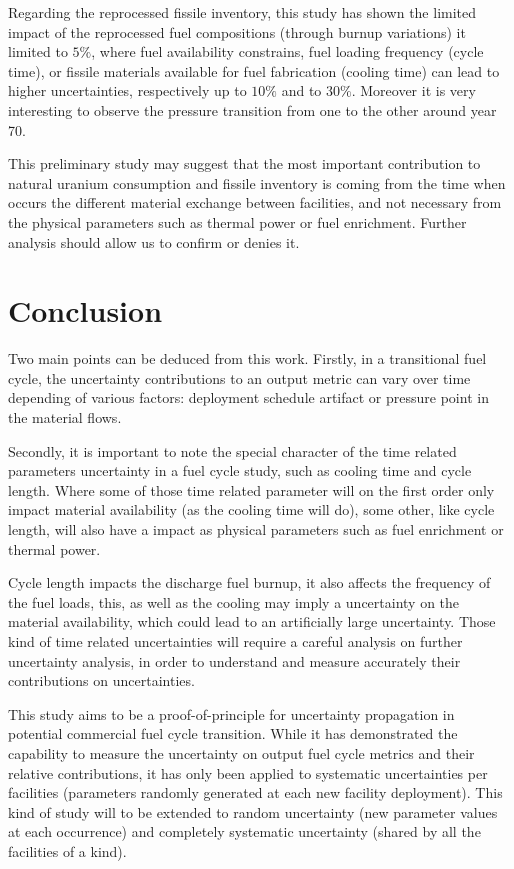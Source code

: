 \documentclass{anstrans}
\begin{document}
Regarding the reprocessed fissile inventory, this study has shown the limited
impact of the reprocessed fuel compositions (through burnup variations) it
limited to $5\%$, where fuel availability constrains, fuel loading frequency (cycle
time), or fissile materials available for fuel fabrication (cooling time) can lead to higher
uncertainties, respectively up to $10\%$ and to $30\%$.  Moreover it is very
interesting to observe the pressure transition from one to the other around
year 70.

This preliminary study may suggest that the most important contribution to
natural uranium consumption and fissile inventory is coming from the time when
occurs the different material exchange between facilities, and not necessary
from the physical parameters such as thermal power or fuel enrichment. Further
analysis should allow us to confirm or denies it.

\section{Conclusion}

Two main points can be deduced from this work.  Firstly, in a transitional
fuel cycle, the uncertainty contributions to an output metric can vary over time
depending of various factors: deployment schedule artifact or pressure point in
the material flows.

Secondly, it is important to note the special character of the time related
parameters uncertainty in a fuel cycle study, such as cooling time and cycle
length.  Where some of those time related parameter will on the first order only
impact material availability (as the cooling time will do), some other, like
cycle length, will also have a impact as physical parameters such as fuel
enrichment or thermal power.  

Cycle length impacts the discharge fuel burnup, it also affects the frequency of
the fuel loads, this, as well as the cooling may imply a uncertainty on the
material availability, which could lead to an artificially large uncertainty.
Those kind of time related uncertainties will require a careful analysis on further
uncertainty analysis, in order to understand and measure accurately their
contributions on uncertainties.

This study aims to be a proof-of-principle for uncertainty propagation in
potential commercial fuel cycle transition.  While it has demonstrated the
capability to measure the uncertainty on output fuel cycle metrics and their
relative contributions, it has only been applied to systematic uncertainties per
facilities (parameters randomly generated at each new facility deployment).
This kind of study will to be extended to random uncertainty (new parameter
values at each occurrence) and completely systematic uncertainty (shared by all
the facilities of a kind).
\end{document}
